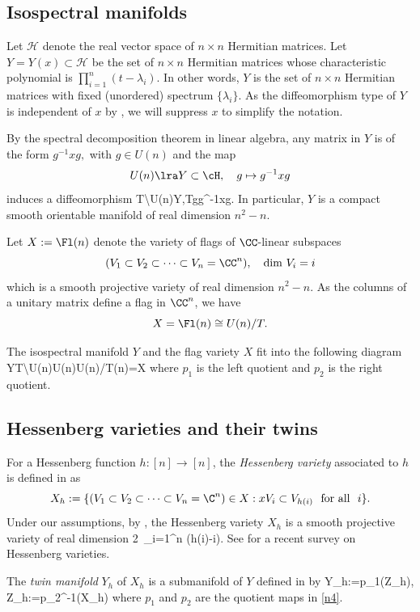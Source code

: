 \subsection{Isospectral manifolds} \label{n46} 
Let $\mathcal{H}$ denote the real vector space of $n\times n$ Hermitian matrices. 
Let $Y=Y(x)\subset \mathcal{H}$ be the set of $n\times n$ Hermitian matrices whose characteristic polynomial is $\prod_{i=1}^n(t-\lambda_i)$.  In other words, $Y$ is the set of $n\times n$ Hermitian matrices with fixed (unordered) spectrum $\{\lambda_i\}$. 
As the diffeomorphism type of $Y$ is independent of $x$ by \cite[Theorem 3.5]{AB}, we will suppress $x$ to simplify the notation.   

By the spectral decomposition theorem in linear algebra, any matrix in $Y$ is of the form
$g^{-1}xg,$ with $g\in U(n)$
and the map  \[ U(n)\lra Y\subset \cH,  \quad g\mapsto g^{-1}xg\]
induces a diffeomorphism 
\beq\label{n7} T\backslash U(n)\cong Y,\quad Tg\mapsto g^{-1}xg.\eeq
In particular, $Y$ is a compact smooth orientable manifold of real dimension $n^2-n$. 

Let $X:=\Fl(n)$ denote the variety of flags of $\CC$-linear subspaces
$$(V_1\subset V_2\subset\cdots\subset V_n=\CC^n), \quad \dim\, V_i=i$$
which is a smooth projective variety of real dimension $n^2-n$. 
As the columns of a unitary matrix define a flag in $\CC^n$, we have 
$$X=\Fl(n)\cong U(n)/T.$$

The isospectral manifold $Y$ and the flag variety $X$ fit into the following diagram
\beq\label{n4}
Y\cong T\backslash U(n)U(n)U(n)/T\cong \Fl(n)=X
\eeq
where $p_1$ is the left quotient and $p_2$ is the right quotient. 



\subsection{Hessenberg varieties and their twins}\label{n29}

For a Hessenberg function $h:[n]\to [n]$, the \emph{Hessenberg variety} associated to $h$ is
defined in \cite{DMPS} as 
\[X_h:=\{(V_1\subset V_2\subset \cdots \subset  V_{n}= \C^n)\in X : xV_i\subset V_{h(i)} ~\text{ for all }~ i\}.\]
Under our assumptions, by \cite{DMPS}, 
the Hessenberg variety $X_h$ is a smooth projective variety of real dimension 
\beq\label{n6}
2\, \sum_{i=1}^n (h(i)-i).\eeq
See \cite{AH} for a recent survey on Hessenberg varieties.


The \emph{twin manifold} $Y_h$ of $X_h$ is a submanifold of $Y$ defined in \cite{AB}  by 
\beq\label{n5} Y_h:=p_1(Z_h), \quad Z_h:=p_2^{-1}(X_h)\eeq
where $p_1$ and $p_2$ are the quotient maps in \eqref{n4}.


